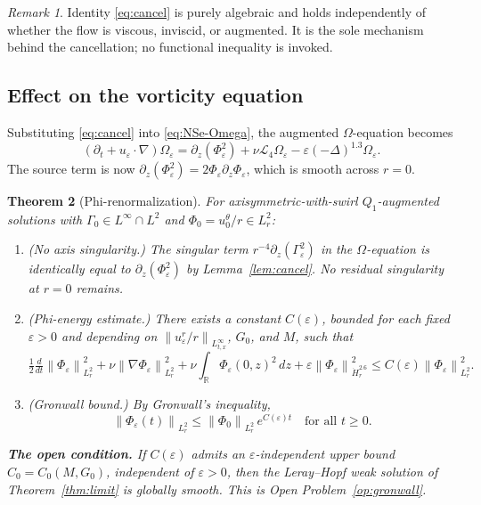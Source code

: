 \documentclass{article}
\newtheorem{theorem}{Theorem}[section]
\theoremstyle{definition}
\theoremstyle{remark}
\newtheorem{remark}[theorem]{Remark}
\newcommand{\R}{\mathbb{R}}
\newcommand{\e}{\varepsilon}
\newcommand{\half}{\tfrac{1}{2}}
\newcommand{\Lc}{\mathcal{L}}
\newcommand{\norm}[1]{\left\|#1\right\|}
\newcommand{\ddt}{\tfrac{d}{dt}}
\begin{document}
\begin{remark}
  Identity \eqref{eq:cancel} is purely algebraic and holds
  independently of whether the flow is viscous, inviscid, or augmented.
  It is the sole mechanism behind the cancellation; no functional
  inequality is invoked.
\end{remark}

\subsection{Effect on the vorticity equation}

Substituting \eqref{eq:cancel} into \eqref{eq:NSe-Omega}, the augmented
$\Omega$-equation becomes
\begin{equation}\label{eq:Omega-renorm}
  (\partial_t + u_\e\cdot\nabla)\Omega_\e
  = \partial_z(\Phi_\e^2)
  + \nu\Lc_4\Omega_\e
  - \e(-\Delta)^{1.3}\Omega_\e.
\end{equation}
The source term is now $\partial_z(\Phi_\e^2) = 2\Phi_\e\partial_z\Phi_\e$,
which is smooth across $r=0$.

\begin{theorem}[Phi-renormalization]\label{thm:phi}
  For axisymmetric-with-swirl $Q_1$-augmented solutions with
  $\Gamma_0\in L^\infty\cap L^2$ and $\Phi_0 = u_0^\theta/r \in L^2_r$:
  \begin{enumerate}
  \item[\textup{(i)}]
    \emph{(No axis singularity.)}
    The singular term $r^{-4}\partial_z(\Gamma_\e^2)$ in the
    $\Omega$-equation is identically equal to $\partial_z(\Phi_\e^2)$
    by Lemma~\ref{lem:cancel}.  No residual singularity at $r=0$
    remains.

  \item[\textup{(ii)}]
    \emph{(Phi-energy estimate.)}
    There exists a constant $C(\e)$, bounded for each fixed $\e > 0$
    and depending on $\norm{u^r_\e/r}_{L^\infty_{t,x}}$, $G_0$, and
    $M$, such that
    \begin{equation}\label{eq:phi-energy}
      \half\ddt\norm{\Phi_\e}_{L^2_r}^2
      + \nu\norm{\nabla\Phi_\e}_{L^2_r}^2
      + \nu\int_{\R}\!\Phi_\e(0,z)^2\,dz
      + \e\norm{\Phi_\e}_{\dot H^{2.6}_r}^2
      \le C(\e)\norm{\Phi_\e}_{L^2_r}^2.
    \end{equation}

  \item[\textup{(iii)}]
    \emph{(Gronwall bound.)}
    By Gronwall's inequality,
    \begin{equation}\label{eq:phi-gronwall}
      \norm{\Phi_\e(t)}_{L^2_r}
      \le \norm{\Phi_0}_{L^2_r}\,e^{C(\e)t}
      \quad\text{for all } t\ge 0.
    \end{equation}
  \end{enumerate}
  
  \medskip\noindent
  \textbf{The open condition.}\enspace
  If $C(\e)$ admits an $\e$-independent upper bound
  $C_0 = C_0(M, G_0)$, independent of $\e > 0$, then the Leray--Hopf
  weak solution of Theorem~\ref{thm:limit} is globally smooth.
  This is Open Problem~\ref{op:gronwall}.
\end{theorem}
\end{document}
